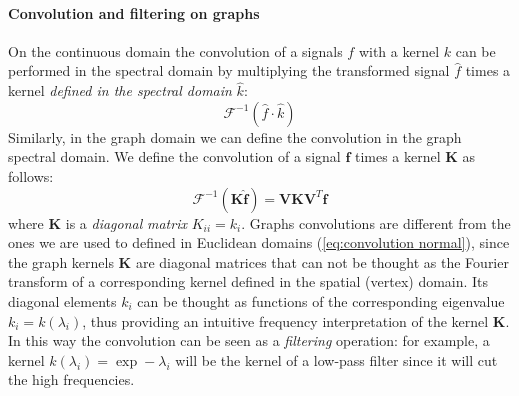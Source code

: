 \paragraph{Convolution and filtering on graphs}
On the continuous domain the convolution of a signals $f$ with a kernel $k$ can be performed in the spectral domain by multiplying the transformed signal $\hat f$ times a kernel \textit{defined in the spectral domain} $\hat k$: 
\begin{equation}\label{eq:convolution normal}
	\mathcal F^{-1}(\hat f \cdot \hat k)
\end{equation}
Similarly, in the graph domain we can define the convolution in the graph spectral domain. We define the convolution of a signal $\mathbf f$ times a kernel $\mathbf K$ as follows:
\begin{equation}\label{eq:graph convolution}
	\mathcal{F}^{-1}(\mathbf K \hat {\mathbf f})= \mathbf V\mathbf K  \mathbf V^T {\mathbf f}
\end{equation}
where $\mathbf K$ is a \textit{diagonal} \textit{matrix} $K_{ii} = k_i$. Graphs convolutions are different from the ones we are used to defined in Euclidean domains (\ref{eq:convolution normal}), since the graph kernels $\mathbf K$ are diagonal matrices that can not be thought as the Fourier transform of a corresponding kernel defined in the spatial (vertex) domain. Its diagonal elements $k_{i}$ can be thought as functions of the corresponding eigenvalue $k_{i}= k(\lambda_i)$, thus providing an intuitive frequency interpretation of the kernel $\mathbf K$. In this way the convolution can be seen as a \textit{filtering} operation: for example, a kernel $k(\lambda_i) = \exp -\lambda_i$ will be the kernel of a low-pass filter since it will cut the high frequencies.

